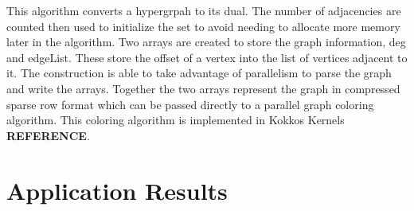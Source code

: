 \documentclass[graybox]{svmult}
\begin{document}
This algorithm converts a hypergrpah to its dual. The number of adjacencies are counted then used to initialize the set to avoid needing to allocate more memory later in the algorithm. Two arrays are created to store the graph information, deg and edgeList. These store the offset of a vertex into the list of vertices adjacent to it. The construction is able to take advantage of parallelism to parse the graph and write the arrays. Together the two arrays represent the graph in compressed sparse row format which can be passed directly to a parallel graph coloring algorithm. This coloring algorithm is implemented in Kokkos Kernels \textbf{REFERENCE}.

\section{Application Results} \label{sec:results}
\end{document}
